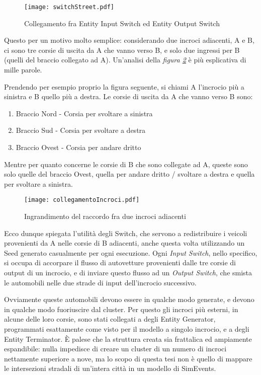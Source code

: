 \begin{figure}[H]
\centering
  \texttt{[image: switchStreet.pdf]}
  \caption{Collegamento fra Entity Input Switch ed Entity Output Switch}
  \label{fig:switchstreet}
\end{figure}

Questo per un motivo molto semplice: considerando due incroci adiacenti, A e B, ci sono tre corsie di uscita da A che vanno verso B, e solo due ingressi per B (quelli del braccio collegato ad A). Un'analisi della \textit{figura \ref{fig:ingrandimentoincroci}} è più esplicativa di mille parole. 

Prendendo per esempio proprio la figura seguente, si chiami A l'incrocio più a sinistra e B quello più a destra. Le corsie di uscita da A che vanno verso B sono:
\begin{enumerate}
  \item Braccio Nord - Corsia per svoltare a sinistra
  \item Braccio Sud - Corsia per svoltare a destra
  \item Braccio Ovest - Corsia per andare dritto
\end{enumerate}
Mentre per quanto concerne le corsie di B che sono collegate ad A, queste sono solo quelle del braccio Ovest, quella per andare dritto / svoltare a destra e quella per svoltare a sinistra.
\begin{figure}[H]
  \texttt{[image: collegamentoIncroci.pdf]}
  \caption{Ingrandimento del raccordo fra due incroci adiacenti}
  \label{fig:ingrandimentoincroci}
\end{figure}

Ecco dunque spiegata l'utilità degli Switch, che servono a redistribuire i veicoli provenienti da A nelle corsie di B adiacenti, anche questa volta utilizzando un Seed generato casualmente per ogni esecuzione. Ogni \textit{Input Switch}, nello specifico, si occupa di accorpare il flusso di autovetture provenienti dalle tre corsie di output di un incrocio, e di inviare questo flusso ad un \textit{Output Switch}, che smista le automobili nelle due strade di input dell'incrocio successivo.
\newline

Ovviamente queste automobili devono essere in qualche modo generate, e devono in qualche modo fuoriuscire dal cluster. Per questo gli incroci più esterni, in alcune delle loro corsie, sono stati collegati a degli Entity Generator, programmati esattamente come visto per il modello a singolo incrocio, e a degli Entity Terminator. È palese che la struttura creata sia frattalica ed ampiamente espandibile: nulla impedisce di creare un cluster di un numero di incroci nettamente superiore a nove, ma lo scopo di questa tesi non è quello di mappare le intersezioni stradali di un'intera città in un modello di SimEvents.

